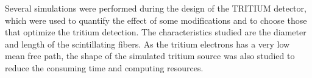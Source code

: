 Several simulations were performed during the design of the TRITIUM detector, which were used to quantify the effect of some modifications and to choose those that optimize the tritium detection. The characteristics studied are the diameter and length of the scintillating fibers. As the tritium electrons has a very low mean free path, the shape of the simulated tritium source was also studied to reduce the consuming time and computing resources. 